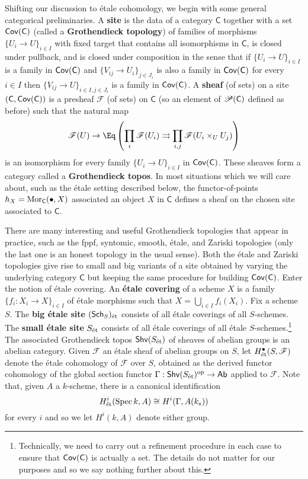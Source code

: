 \documentclass[11pt]{article}
\newcommand{\F}{\mathscr{F}}
\begin{document}
Shifting our discussion to \'{e}tale cohomology, we begin with some general categorical preliminaries. A \textbf{site} is the data of a category $\mathsf{C}$ together with a set $\operatorname{\mathsf{Cov}}(\mathsf{C})$ (called a \textbf{Grothendieck topology}) of families of morphisms $\{U_i\to U\}_{i\in I}$ with fixed target that contains all isomorphisms in $\mathsf{C}$, is closed under pullback, and is closed under composition in the sense that if $\{U_i\to U\}_{i\in I}$ is a family in $\operatorname{\mathsf{Cov}}(\mathsf{C})$ and $\{V_{ij}\to U_i\}_{j\in J_i}$ is also a family in $\operatorname{\mathsf{Cov}}(\mathsf{C})$ for every $i\in I$ then $\{V_{ij}\to U\}_{i\in I,j\in J_i}$ is a family in $\operatorname{\mathsf{Cov}}(\mathsf{C})$. A \textbf{sheaf} (of sets) on a site $(\mathsf{C},\operatorname{\mathsf{Cov}}(\mathsf{C}))$ is a presheaf $\F$ (of sets) on $\mathsf{C}$ (so an element of $\mathscr{P}(\mathsf{C})$ defined as before) such that the natural map
\begin{equation*}
\F(U)\to\Eq\paren{\prod_i\F(U_i)\rightrightarrows\prod_{i,j}\F(U_i\times_UU_j)}
\end{equation*}
is an isomorphism for every family $\{U_i\to U\}_{i\in I}$ in $\operatorname{\mathsf{Cov}}(\mathsf{C})$. These sheaves form a category called a \textbf{Grothendieck topos}. In most situations which we will care about, such as the \'{e}tale setting described below, the functor-of-points $h_X=\operatorname{Mor}_{\mathsf{C}}(\bullet,X)$ associated an object $X$ in $\mathsf{C}$ defines a sheaf on the chosen site associated to $\mathsf{C}$.

There are many interesting and useful Grothendieck topologies that appear in practice, such as the fppf, syntomic, smooth, \'{e}tale, and Zariski topologies (only the last one is an honest topology in the usual sense). Both the \'{e}tale and Zariski topologies give rise to small and big variants of a site obtained by varying the underlying category $\mathsf{C}$ but keeping the same procedure for building $\operatorname{\mathsf{Cov}}(\mathsf{C})$. Enter the notion of \'{e}tale covering. An \textbf{\'{e}tale covering} of a scheme $X$ is a family $\{f_i: X_i\to X\}_{i\in I}$ of \'{e}tale morphisms such that $X=\bigcup_{i\in I}f_i(X_i)$. Fix a scheme $S$. The \textbf{big \'{e}tale site} $(\operatorname{\mathsf{Sch}}_S)_{\operatorname{\acute{e}t}}$ consists of all \'{e}tale coverings of all $S$-schemes. The \textbf{small \'{e}tale site} $S_{\operatorname{\acute{e}t}}$ consists of all \'{e}tale coverings of all \'{e}tale $S$-schemes.\footnote{Technically, we need to carry out a refinement procedure in each case to ensure that $\operatorname{\mathsf{Cov}}(\mathsf{C})$ is actually a set. The details do not matter for our purposes and so we say nothing further about this.} The associated Grothendieck topos $\operatorname{\mathsf{Shv}}(S_{\operatorname{\acute{e}t}})$ of sheaves of abelian groups is an abelian category. Given $\F$ an \'{e}tale sheaf of abelian groups on $S$, let $H_{\et}^{\bullet}(S,\F)$ denote the \'{e}tale cohomology of $\F$ over $S$, obtained as the derived functor cohomology of the global section functor $\Gamma: \operatorname{\mathsf{Shv}}(S_{\operatorname{\acute{e}t}})^{\operatorname{op}}\to\operatorname{\mathsf{Ab}}$ applied to $\F$. Note that, given $A$ a $k$-scheme, there is a canonical identification 
$$H_{\operatorname{\acute{e}t}}^i(\operatorname{Spec} k,A)\cong H^i(\Gamma,A(k_s))$$
for every $i$ and so we let $H^i(k,A)$ denote either group.
\end{document}
